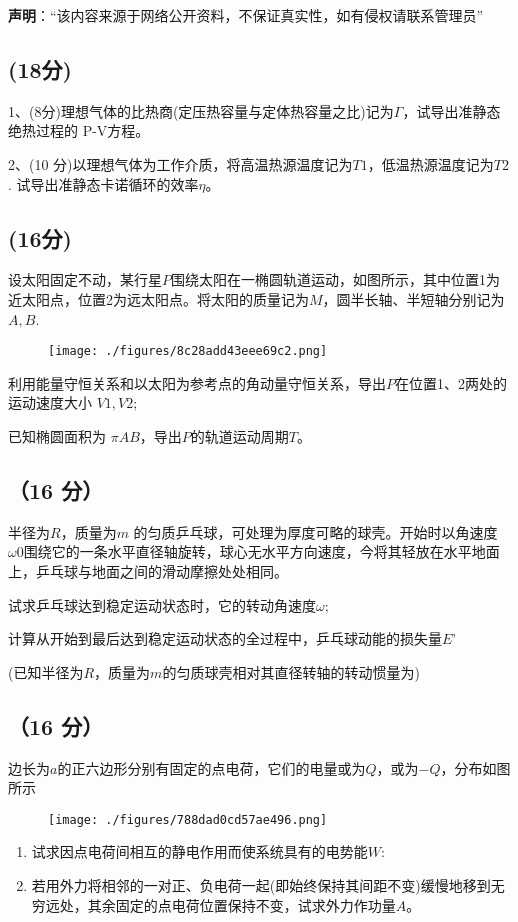 
\textbf{声明}：“该内容来源于网络公开资料，不保证真实性，如有侵权请联系管理员”

\subsection{(18分)}
1、(8分)理想气体的比热商(定压热容量与定体热容量之比)记为$\Gamma$，试导出准静态绝热过程的 P-V方程。

2、(10 分)以理想气体为工作介质，将高温热源温度记为$T1$，低温热源温度记为$T2$.
试导出准静态卡诺循环的效率$\eta$。
\subsection{(16分)}
设太阳固定不动，某行星$P$围绕太阳在一椭圆轨道运动，如图所示，其中位置1为近太阳点，位置2为远太阳点。将太阳的质量记为$M$，圆半长轴、半短轴分别记为$A,B$.
\begin{figure}[ht]
\centering
\texttt{[image: ./figures/8c28add43eee69c2.png]}
\caption{} \label{fig_PKU200_1}
\end{figure}
利用能量守恒关系和以太阳为参考点的角动量守恒关系，导出$P$在位置1、2两处的运动速度大小 $V1,V2$;

已知椭圆面积为 $\pi AB$，导出$P$的轨道运动周期$T$。
\subsection{（16 分）}
半径为$R$，质量为$m$ 的匀质乒乓球，可处理为厚度可略的球壳。开始时以角速度$\omega0$围绕它的一条水平直径轴旋转，球心无水平方向速度，今将其轻放在水平地面上，乒乓球与地面之间的滑动摩擦处处相同。

试求乒乓球达到稳定运动状态时，它的转动角速度$\omega$;

计算从开始到最后达到稳定运动状态的全过程中，乒乓球动能的损失量$E$'

(已知半径为$R$，质量为$m$的匀质球壳相对其直径转轴的转动惯量为)
\subsection{（16 分）}
边长为$a$的正六边形分别有固定的点电荷，它们的电量或为$Q$，或为$-Q$，分布如图所示
\begin{figure}[ht]
\centering
\texttt{[image: ./figures/788dad0cd57ae496.png]}
\caption{} \label{fig_PKU200_2}
\end{figure}
\begin{enumerate}
\item 试求因点电荷间相互的静电作用而使系统具有的电势能$W$:
\item 若用外力将相邻的一对正、负电荷一起(即始终保持其间距不变)缓慢地移到无穷远处，其余固定的点电荷位置保持不变，试求外力作功量$A$。
\end{enumerate}
